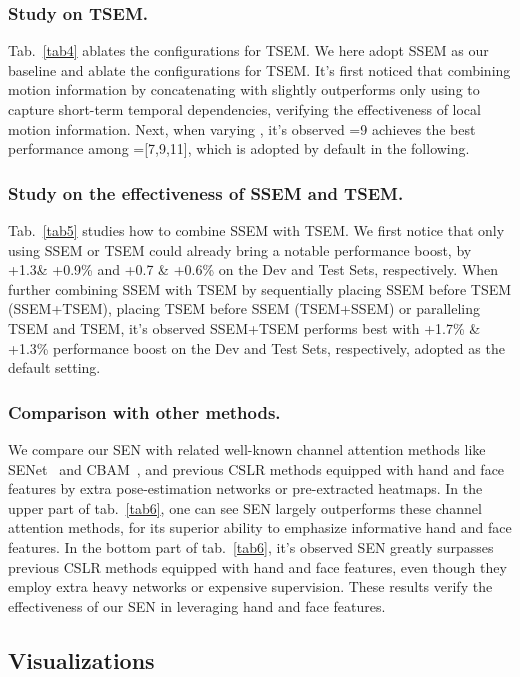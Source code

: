 \documentclass[letterpaper]{article} \usepackage{aaai23}  \usepackage{times}  \usepackage{helvet}  \usepackage{courier}  \usepackage[hyphens]{url}  \usepackage{graphicx} \urlstyle{rm} \def\UrlFont{\rm}  \usepackage{natbib}  \usepackage{caption} \frenchspacing  \setlength{\pdfpagewidth}{8.5in} \setlength{\pdfpageheight}{11in} \usepackage{algorithm}
\begin{document}
\subsubsection{Study on TSEM.} Tab.~\ref{tab4} ablates the configurations for TSEM. We here adopt SSEM as our baseline and ablate the configurations for TSEM. It's first noticed that combining motion information by concatenating  with  slightly outperforms only using  to capture short-term temporal dependencies, verifying the effectiveness of local motion information. Next, when varying , it's observed =9 achieves the best performance among =[7,9,11], which is adopted by default in the following.

\subsubsection{Study on the effectiveness of SSEM and TSEM.} Tab.~\ref{tab5} studies how to combine SSEM with TSEM. We first notice that only using SSEM or TSEM could already bring a notable performance boost, by +1.3\& +0.9\% and +0.7 \& +0.6\% on the Dev and Test Sets, respectively. When further combining SSEM with TSEM by sequentially placing SSEM before TSEM (SSEM+TSEM), placing TSEM before SSEM (TSEM+SSEM) or paralleling TSEM and TSEM, it's observed SSEM+TSEM performs best with +1.7\% \& +1.3\% performance boost on the Dev and Test Sets, respectively, adopted as the default setting.

\subsubsection{Comparison with other methods.} We compare our SEN with related well-known channel attention methods like SENet~\cite{hu2018squeeze} and CBAM~\cite{woo2018cbam}, and previous CSLR methods equipped with hand and face features by extra pose-estimation networks or pre-extracted heatmaps. In the upper part of tab.~\ref{tab6}, one can see SEN largely outperforms these channel attention methods, for its superior ability to emphasize informative hand and face features. In the bottom part of tab.~\ref{tab6}, it's observed SEN greatly surpasses previous CSLR methods equipped with hand and face features, even though they employ extra heavy networks or expensive supervision. These results verify the effectiveness of our SEN in leveraging hand and face features.

\subsection{Visualizations}
\end{document}
